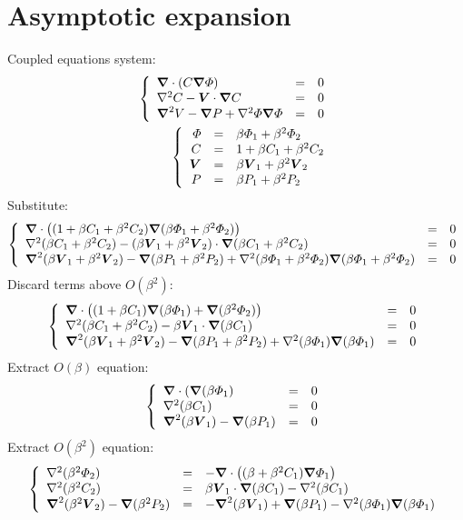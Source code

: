 \section{Asymptotic expansion}
Coupled equations system:
\begin{eqnarray}
 \brc{lll}{
  \bnabla \cdot \brcs{C \bnabla \varPhi} &=& 0 \\
  \Laplacian C - \bV \cdot \bnabla C &=& 0 \\
  \bLaplacian V - \bnabla P + \Laplacian \varPhi \bnabla\varPhi &=& 0 }
  \\
 \brc{rcl}{
  \varPhi &=& \beta\varPhi_1 + \beta^2\varPhi_2 \\
  C &=& 1 + \beta C_1 + \beta^2 C_2 \\
  \bV &=& \beta \bV_1 + \beta^2 \bV_2 \\
  P &=& \beta P_1 + \beta^2 P_2}
\end{eqnarray}
Substitute:
\begin{eqnarray}
 \brc{lll}{
  \bnabla \cdot \brcs{(1 + \beta C_1 + \beta^2 C_2) \bnabla (\beta\varPhi_1 + \beta^2\varPhi_2)} &=& 0 \\
  \Laplacian (\beta C_1 + \beta^2 C_2) - (\beta \bV_1 + \beta^2 \bV_2) \cdot \bnabla (\beta C_1 + \beta^2 C_2) &=& 0 \\
  \bLaplacian (\beta \bV_1 + \beta^2 \bV_2) - \bnabla (\beta P_1 + \beta^2 P_2) + \Laplacian (\beta\varPhi_1 + \beta^2\varPhi_2) \bnabla(\beta\varPhi_1 + \beta^2\varPhi_2) &=& 0 }
\end{eqnarray}
Discard terms above $O(\beta^2)$:
\begin{eqnarray}
 \brc{lll}{
  \bnabla \cdot \brcs{(1 + \beta C_1) \bnabla (\beta \varPhi_1) + \bnabla(\beta^2\varPhi_2)} &=& 0 \\
  \Laplacian (\beta C_1 + \beta^2 C_2) - \beta \bV_1 \cdot \bnabla (\beta C_1) &=& 0 \\
  \bLaplacian (\beta \bV_1 + \beta^2 \bV_2) - \bnabla (\beta P_1 + \beta^2 P_2) + \Laplacian (\beta\varPhi_1) \bnabla(\beta\varPhi_1) &=& 0 }
\end{eqnarray}
Extract $O(\beta)$ equation:
\begin{eqnarray}
 \brc{lll}{
  \bnabla \cdot \brcs{\bnabla (\beta\varPhi_1} &=& 0 \\
  \Laplacian (\beta C_1) &=& 0 \\
  \bLaplacian (\beta \bV_1) - \bnabla (\beta P_1) &=& 0 }
\end{eqnarray}
Extract $O(\beta^2)$ equation:
\begin{eqnarray}
 \brc{lll}{
  \Laplacian (\beta^2 \varPhi_2) &=& - \bnabla \cdot \brcs{(\beta + \beta^2 C_1) \bnabla \varPhi_1}
  \\
  \Laplacian (\beta^2 C_2) &=& \beta \bV_1 \cdot \bnabla (\beta C_1) -\Laplacian (\beta C_1)
  \\
  \bLaplacian (\beta^2 \bV_2) - \bnabla (\beta^2 P_2) &=& - \bLaplacian (\beta \bV_1) + \bnabla (\beta P_1) - \Laplacian (\beta\varPhi_1) \bnabla(\beta\varPhi_1)}
\end{eqnarray}
